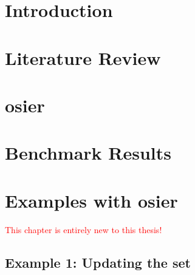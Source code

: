 \chapter{Introduction}






\chapter{Literature Review}
\label{chapter:lit-review}
% 

\chapter{\acf{osier}}
\label{chapter:osier}
% 


\chapter{Benchmark Results}
\label{chapter:benchmark-results}


\chapter{Examples with \acs{osier}}
\label{chapter:examples}

\textcolor{red}{This chapter is entirely new to this thesis!}

\section{Example 1: Updating the \ac{set}}

